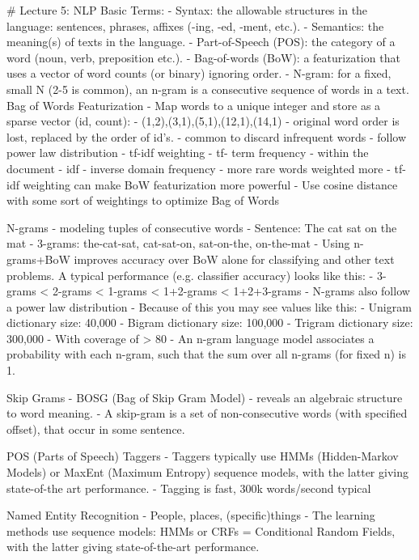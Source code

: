 \documentclass[3pt,landscape]{article}
\begin{document}
\begin{multicols}{3}
\# Lecture 5: NLP
Basic Terms: 
- Syntax: the allowable structures in the language: sentences, phrases, affixes (-ing, -ed, -ment, etc.).
- Semantics: the meaning(s) of texts in the language.
-  Part-of-Speech (POS): the category of a word (noun, verb, preposition etc.).
- Bag-of-words (BoW): a featurization that uses a vector of word counts (or binary) ignoring order.
- N-gram: for a fixed, small N (2-5 is common), an n-gram is a consecutive sequence of words in a text. 
Bag of Words Featurization 
- Map words to a unique integer and store as a sparse vector (id, count):
  - (1,2),(3,1),(5,1),(12,1),(14,1) 
- original word order is lost, replaced by the order of id’s.
  - common to discard infrequent words 
  - follow power law distribution 
- tf-idf weighting
  - tf- term frequency - within the document 
  - idf - inverse domain frequency  - more rare words weighted more
  - tf-idf weighting can make BoW featurization more powerful
- Use cosine distance with some sort of weightings to optimize Bag of Words
  
N-grams
- modeling tuples of consecutive words
  - Sentence:  The        cat      sat      on        the          mat 
  - 3-grams: the-cat-sat, cat-sat-on, sat-on-the, on-the-mat 
- Using n-grams+BoW improves accuracy over BoW alone for classifying and other text problems. A typical performance (e.g. classifier accuracy) looks like this:
  - 3-grams < 2-grams < 1-grams < 1+2-grams < 1+2+3-grams 
- N-grams also follow a power law distribution
  - Because of this you may see values like this:
    - Unigram dictionary size: 40,000
    - Bigram dictionary size: 100,000
    - Trigram dictionary size: 300,000
  - With coverage of > 80%
- An n-gram language model associates a probability with each n-gram, such that the sum over all n-grams (for fixed n) is 1. 

Skip Grams 
- BOSG (Bag of Skip Gram Model) - reveals an algebraic structure to word meaning. 
- A skip-gram is a set of non-consecutive words (with specified offset), that occur in some sentence. 

POS (Parts of Speech) Taggers
- Taggers typically use HMMs (Hidden-Markov Models) or MaxEnt (Maximum Entropy) sequence models, with the latter giving state-of-the art performance. 
- Tagging is fast, 300k words/second typical  

Named Entity Recognition
- People, places, (specific)things 
- The learning methods use sequence models: HMMs or CRFs = Conditional Random Fields, with the latter giving state-of-the-art performance. 


\end{multicols}
\end{document}
